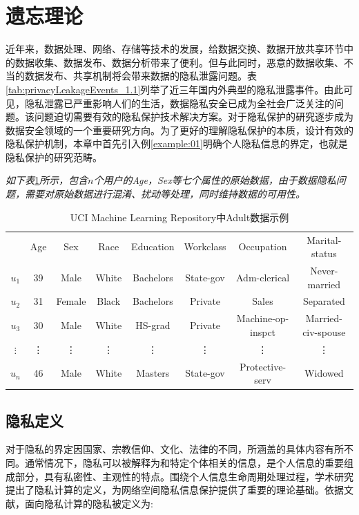 \section{遗忘理论}







近年来，数据处理、网络、存储等技术的发展，给数据交换、数据开放共享环节中的数据收集、数据发布、数据分析带来了便利。但与此同时，恶意的数据收集、不当的数据发布、共享机制将会带来数据的隐私泄露问题。表\ref{tab:privacyLeakageEvents_1.1}列举了近三年国内外典型的隐私泄露事件。由此可见，隐私泄露已严重影响人们的生活，数据隐私安全已成为全社会广泛关注的问题。该问题迫切需要有效的隐私保护技术解决方案。对于隐私保护的研究逐步成为数据安全领域的一个重要研究方向。为了更好的理解隐私保护的本质，设计有效的隐私保护机制，本章中首先引入例\ref{example:01}明确个人隐私信息的界定，也就是隐私保护的研究范畴。

\begin{example}\label{example:01}{\em 如下表}\ref{tab:origin}{\em 所示，包含$n$个用户的Age，Sex等七个属性的原始数据，由于数据隐私问题，需要对原始数据进行混淆、扰动等处理，同时维持数据的可用性。
	}
	\begin{table}[h!]
		\small
		\centering\caption{UCI Machine Learning Repository中Adult数据示例}
		\begin{tabular}{c|c|c|c|c|c|c|c|}
			\cline{2-8}
			& Age & Sex & Race & Education &Workclass &Occupation &Marital-status \\
			\cline{2-8}
			$u_1$ & 39 & Male & White & Bachelors& State-gov & Adm-clerical & Never-married \\
			$u_2$ & 31 & Female & Black & Bachelors &  Private &  Sales & Separated\\
			$u_{3}$ & 30 & Male& White & HS-grad  & Private  & Machine-op-inspct  & Married-civ-spouse\\
			$\vdots$ & \vdots & \vdots & \vdots & \vdots & \vdots & \vdots & \vdots \\
			$u_n$ & 46 & Male & White & Masters  & State-gov  & Protective-serv  &Widowed\\
			\cline{2-8}
		\end{tabular}\label{tab:origin}
	\end{table}
\end{example}

\subsection{隐私定义}
对于隐私的界定因国家、宗教信仰、文化、法律的不同，所涵盖的具体内容有所不同\cite{Lifenghua16}。通常情况下，隐私可以被解释为和特定个体相关的信息，是个人信息的重要组成部分，具有私密性、主观性的特点。围绕个人信息生命周期处理过程，学术研究提出了隐私计算的定义，为网络空间隐私信息保护提供了重要的理论基础\cite{Lifenghua16}。依据文献，面向隐私计算的隐私被定义为:

